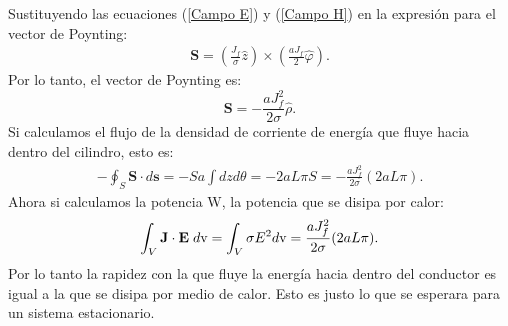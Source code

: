 \documentclass[11pt,fleqn]{book} %
\begin{document}
\begin{example}
Sustituyendo las ecuaciones (\ref{Campo E}) y (\ref{Campo H}) en la expresi\'on para el vector de Poynting:
\begin{eqnarray*}
\textbf{S}=\left(\frac{J_{f}}{\sigma}\hat{z}\right)\times\left( \frac{aJ_{f}}{2}\hat{\varphi} \right).
\end{eqnarray*}
Por lo tanto, el vector de Poynting es:
\begin{equation}
\textbf{S}=-\frac{a J_{f}^{2}}{2\sigma}\hat{\rho}. \label{S}
\end{equation}
Si calculamos el flujo de la densidad de corriente de energ\'ia que fluye hacia dentro del cilindro, esto es:
\begin{eqnarray*}
-\oint_{S}\textbf{S}\cdot d\textbf{s}=-Sa\int  dz d\theta=-2aL\pi S=-\frac{a J_{f}^{2}}{2\sigma}(2aL\pi).
\end{eqnarray*}
 Ahora si calculamos la potencia W, la potencia que se disipa por calor:
\begin{eqnarray*}
\int_{V} \textbf{J}\cdot\textbf{E} \hspace{1mm} d\text{v}=\int_{V} \sigma E^{2} d\text{v}=\frac{a J_{f}^{2}}{2\sigma}(2aL\pi).
\end{eqnarray*}
 Por lo tanto la rapidez con la que fluye la energ\'ia hacia dentro del conductor es igual a la que se disipa por medio de calor. Esto es justo lo que se esperara para un sistema estacionario.

\end{example}
\end{document}
